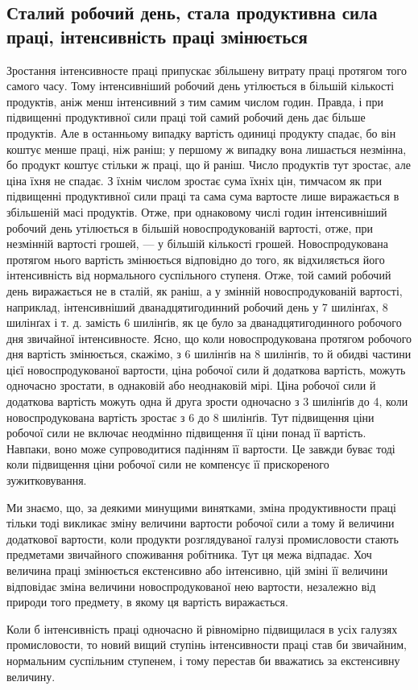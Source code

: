 \subsection{Сталий робочий день, стала продуктивна сила праці,
інтенсивність праці змінюється}

Зростання інтенсивносте праці припускає збільшену витрату
праці протягом того самого часу. Тому інтенсивніший робочий
день утілюється в більшій кількості продуктів, аніж менш
інтенсивний з тим самим числом годин. Правда, і при підвищенні
продуктивної сили праці той самий робочий день дає
більше продуктів. Але в останньому випадку вартість одиниці
продукту спадає, бо він коштує менше праці, ніж раніш; у першому
ж випадку вона лишається незмінна, бо продукт коштує
стільки ж праці, що й раніш. Число продуктів тут зростає, але
ціна їхня не спадає. З їхнім числом зростає сума їхніх цін, тимчасом
як при підвищенні продуктивної сили праці та сама сума
вартосте лише виражається в збільшеній масі продуктів. Отже,
при однаковому числі годин інтенсивніший робочий день утілюється
в більшій новоспродукованій вартості, отже, при незмінній
вартості грошей, — у більшій кількості грошей. Новоспродукована
протягом нього вартість змінюється відповідно до того,
як відхиляється його інтенсивність від нормального суспільного
ступеня. Отже, той самий робочий день виражається не в сталій,
як раніш, а у змінній новоспродукованій вартості, наприклад,
інтенсивніший дванадцятигодинний робочий день у 7 шилінґах,
8 шилінґах і т. д. замість 6 шилінґів, як це було за дванадцятигодинного
робочого дня звичайної інтенсивносте. Ясно, що коли
новоспродукована протягом робочого дня вартість змінюється,
скажімо, з 6 шилінґів на 8 шилінґів, то й обидві частини цієї
новоспродукованої вартости, ціна робочої сили й додаткова вартість,
можуть одночасно зростати, в однаковій або неоднаковій
мірі. Ціна робочої сили й додаткова вартість можуть одна й друга
зрости одночасно з 3 шилінґів до 4, коли новоспродукована вартість
зростає з 6 до 8 шилінґів. Тут підвищення ціни робочої
сили не включає неодмінно підвищення її ціни понад її вартість.
Навпаки, воно може супроводитися падінням її вартости. Це
завжди буває тоді коли підвищення ціни робочої сили не компенсує
її прискореного зужитковування.

Ми знаємо, що, за деякими минущими винятками, зміна
продуктивности праці тільки тоді викликає зміну величини вартости
робочої сили а тому й величини додаткової вартости, коли
продукти розглядуваної галузі промисловости стають предметами
звичайного споживання робітника. Тут ця межа відпадає.
Хоч величина праці змінюється екстенсивно або інтенсивно, цій
зміні її величини відповідає зміна величини новоспродукованої
нею вартости, незалежно від природи того предмету, в якому
ця вартість виражається.

Коли б інтенсивність праці одночасно й рівномірно підвищилася
в усіх галузях промисловости, то новий вищий ступінь інтенсивности
праці став би звичайним, нормальним суспільним ступенем,
і тому перестав би вважатись за екстенсивну величину.
\parbreak{}  %
